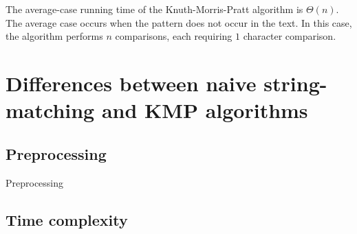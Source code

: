 \documentclass[11pt]{article}
\begin{document}
            The average-case running time of the Knuth-Morris-Pratt algorithm is $\Theta(n)$.
            The average case occurs when the pattern does not occur in the text.
            In this case, the algorithm performs $n$ comparisons, each requiring $1$ character comparison.

    \section{Differences between naive string-matching and KMP algorithms} \label{sec:naive_kmp_differences}

        \subsection{Preprocessing} \label{subsec:preprocessing}

            Preprocessing

        \subsection{Time complexity} \label{subsec:naive_kmp_time_complexity}

            \begin{table}[H]
                \centering
                \caption{Time complexity of the naive and KMP algorithms.}
                \label{tab:naive_kmp_time_complexity}
            \end{table}
\end{document}
